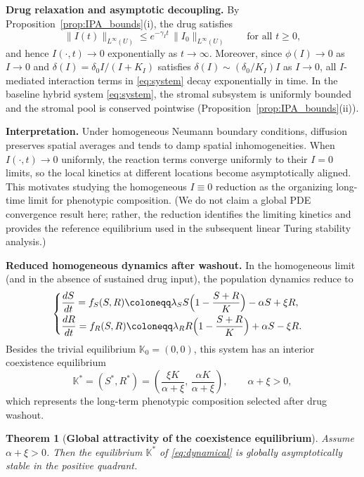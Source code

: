 \documentclass[pdflatex,sn-mathphys-ay]{sn-jnl}
\theoremstyle{thmstyleone}
\newtheorem{theorem}{Theorem}[section]
\theoremstyle{definition}
\theoremstyle{remark}
\begin{document}
\medskip
\noindent\textbf{Drug relaxation and asymptotic decoupling.}
By Proposition~\ref{prop:IPA_bounds}(i), the drug satisfies
\[
\|I(t)\|_{L^\infty(U)} \le e^{-\gamma_I t}\,\|I_0\|_{L^\infty(U)} \qquad \text{for all }t\ge 0,
\]
and hence $I(\cdot,t)\to 0$ exponentially as $t\to\infty$. 
Moreover, since $\phi(I)\to 0$ as $I\to 0$ and $\delta(I)=\delta_0 I/(I+K_I)$ satisfies $\delta(I)\sim (\delta_0/K_I)I$ as $I\to 0$, all $I$-mediated interaction terms in \eqref{eq:system} decay exponentially in time. 
In the baseline hybrid system \eqref{eq:system}, the stromal subsystem is uniformly bounded and the stromal pool is conserved pointwise (Proposition~\ref{prop:IPA_bounds}(ii)).

\medskip
\noindent\textbf{Interpretation.}
Under homogeneous Neumann boundary conditions, diffusion preserves spatial averages and tends to damp spatial inhomogeneities. 
When $I(\cdot,t)\to 0$ uniformly, the reaction terms converge uniformly to their $I=0$ limits, so the local kinetics at different locations become asymptotically aligned. 
This motivates studying the homogeneous $I\equiv 0$ reduction as the organizing long-time limit for phenotypic composition. 
(We do not claim a global PDE convergence result  here; rather, the reduction identifies the limiting kinetics and provides the reference equilibrium used in the subsequent linear Turing stability analysis.)

\medskip
\noindent\textbf{Reduced homogeneous dynamics after washout.}
In the homogeneous limit (and in the absence of sustained drug input), the population dynamics reduce to
\begin{align}
\label{eq:dynamical}
\begin{cases}
\dfrac{dS}{dt} = f_S(S,R)\coloneqq \lambda_S S\Bigl(1-\dfrac{S+R}{K}\Bigr)-\alpha S+\xi R,\\[6pt]
\dfrac{dR}{dt} = f_R(S,R)\coloneqq \lambda_R R\Bigl(1-\dfrac{S+R}{K}\Bigr)+\alpha S-\xi R.
\end{cases}
\end{align}
Besides the trivial equilibrium $\mathbb{K}_0=(0,0)$, this system has an interior coexistence equilibrium
\[
\mathbb{K}^*=(S^*,R^*)
=\left(\frac{\xi K}{\alpha+\xi},\,\frac{\alpha K}{\alpha+\xi}\right),
\qquad \alpha+\xi>0,
\]
which represents the long-term phenotypic composition selected after drug washout.

\begin{theorem}[\textbf{Global attractivity of the coexistence equilibrium}]
\label{thm:global_attract}
Assume $\alpha+\xi>0$. 
Then the equilibrium $\mathbb{K}^*$ of \eqref{eq:dynamical} is globally asymptotically stable in the positive quadrant.
\end{theorem}
\end{document}
